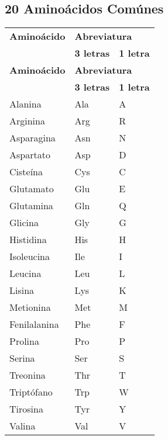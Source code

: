 \subsection*{20 Amino\'{a}cidos Com\'{u}nes} 
\begin{longtable}[l]{lll}
   \textbf{Amino\'{a}cido} & \multicolumn{2}{l}{\textbf{Abreviatura}} \\
  \cline{2-3}
  &\textbf{3 letras}&\textbf{1 letra}\\[0.5ex] \hline%
  \endfirsthead%
 \textbf{Amino\'{a}cido} & \multicolumn{2}{l}{\textbf{Abreviatura}} \\
  \cline{2-3}
  &\textbf{3 letras}&\textbf{1 letra}\\[0.5ex] \hline%
 \endhead%
\renewcommand{\arraystretch}{1.4}\label{amino}
Alanina&Ala&A\\
Arginina&Arg&R\\
Asparagina&Asn&N\\
Aspartato&Asp&D\\
Ciste\'{i}na&Cys&C\\
Glutamato&Glu&E\\
Glutamina&Gln&Q\\
Glicina&Gly&G\\
Histidina&His&H\\
Isoleucina&Ile&I\\
Leucina&Leu&L\\
Lisina&Lys&K\\
Metionina&Met&M\\
Fenilalanina&Phe&F\\
Prolina&Pro&P\\
Serina&Ser&S\\
Treonina&Thr&T\\
Tript\'{o}fano&Trp&W\\
Tirosina&Tyr&Y\\
Valina&Val&V\\ \hline
\end{longtable}


\setlength{\extrarowheight}{0pt}